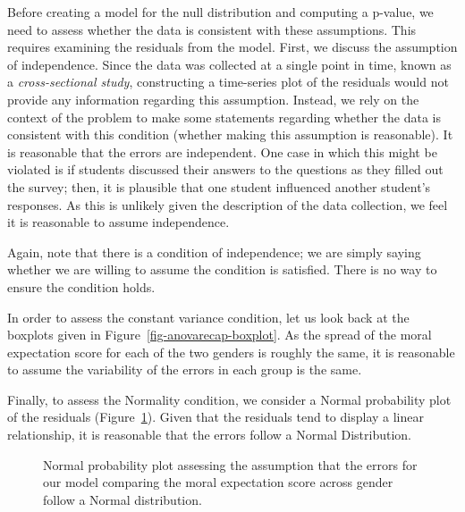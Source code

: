 \documentclass[
  letterpaper,
  DIV=11,
  numbers=noendperiod]{scrreprt}
\theoremstyle{definition}
\theoremstyle{definition}
\theoremstyle{plain}
\theoremstyle{remark}
\begin{document}
Before creating a model for the null distribution and computing a
p-value, we need to assess whether the data is consistent with these
assumptions. This requires examining the residuals from the model.
First, we discuss the assumption of independence. Since the data was
collected at a single point in time, known as a \emph{cross-sectional
study}, constructing a time-series plot of the residuals would not
provide any information regarding this assumption. Instead, we rely on
the context of the problem to make some statements regarding whether the
data is consistent with this condition (whether making this assumption
is reasonable). It is reasonable that the errors are independent. One
case in which this might be violated is if students discussed their
answers to the questions as they filled out the survey; then, it is
plausible that one student influenced another student's responses. As
this is unlikely given the description of the data collection, we feel
it is reasonable to assume independence.

Again, note that there is a condition of independence; we are simply
saying whether we are willing to assume the condition is satisfied.
There is no way to ensure the condition holds.

In order to assess the constant variance condition, let us look back at
the boxplots given in Figure~\ref{fig-anovarecap-boxplot}. As the spread
of the moral expectation score for each of the two genders is roughly
the same, it is reasonable to assume the variability of the errors in
each group is the same.

Finally, to assess the Normality condition, we consider a Normal
probability plot of the residuals
(Figure~\ref{fig-anovarecap-resids-probplot}). Given that the residuals
tend to display a linear relationship, it is reasonable that the errors
follow a Normal Distribution.

\begin{figure}


\caption{\label{fig-anovarecap-resids-probplot}Normal probability plot
assessing the assumption that the errors for our model comparing the
moral expectation score across gender follow a Normal distribution.}

\end{figure}%
\end{document}

